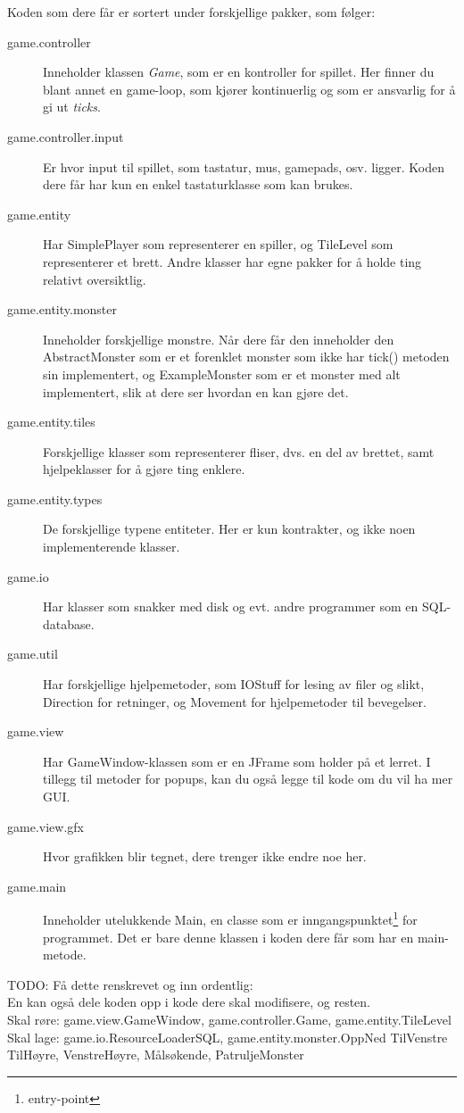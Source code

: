 \documentclass{article}
\begin{document}
Koden som dere får er sortert under forskjellige pakker, som følger:
\begin{description}
\item [game.controller] Inneholder klassen \emph{Game}, som er en kontroller for spillet.
  Her finner du blant annet en game-loop, som kjører kontinuerlig og som er ansvarlig for å gi ut \emph{ticks}.
\item [game.controller.input] Er hvor input til spillet, som tastatur, mus, gamepads, osv. ligger. Koden dere får har kun en enkel tastaturklasse som kan brukes.
\item [game.entity] Har SimplePlayer som representerer en spiller, og TileLevel som representerer et brett. Andre klasser har egne pakker for å holde ting relativt oversiktlig.
\item [game.entity.monster] Inneholder forskjellige monstre. Når dere får den inneholder den AbstractMonster som er et forenklet monster som ikke har tick() metoden sin implementert, og ExampleMonster som er et monster med alt implementert, slik at dere ser hvordan en kan gjøre det.
\item [game.entity.tiles] Forskjellige klasser som representerer fliser, dvs. en del av brettet, samt hjelpeklasser for å gjøre ting enklere.
\item [game.entity.types] De forskjellige typene entiteter. Her er kun kontrakter, og ikke noen implementerende klasser.
\item [game.io] Har klasser som snakker med disk og evt. andre programmer som en SQL-database.
\item [game.util] Har forskjellige hjelpemetoder, som IOStuff for lesing av filer og slikt, Direction for retninger, og Movement for hjelpemetoder til bevegelser.
\item [game.view] Har GameWindow-klassen som er en JFrame som holder på et lerret.
  I tillegg til metoder for popups, kan du også legge til kode om du vil ha mer GUI.
\item [game.view.gfx] Hvor grafikken blir tegnet, dere trenger ikke endre noe her. %
\item [game.main] Inneholder utelukkende Main, en classe som er inngangspunktet\footnote{entry-point} for programmet. Det er bare denne klassen i koden dere får som har en main-metode.
\end{description}

TODO: Få dette renskrevet og inn ordentlig: \\
En kan også dele koden opp i kode dere skal modifisere, og resten.\\
Skal røre: game.view.GameWindow, game.controller.Game, game.entity.TileLevel \\
Skal lage: game.io.ResourceLoaderSQL, game.entity.monster.{OppNed TilVenstre TilHøyre, VenstreHøyre, Målsøkende, Patrulje}Monster
    
\end{document}
